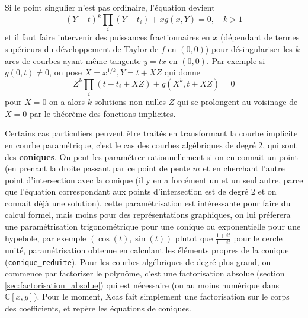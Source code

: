 \documentclass[a4paper,11pt]{article}
\begin{document}
\begin{giacjshere}
Si le point singulier n'est pas ordinaire, l'\'equation devient
$$ (Y-t)^k \prod_i (Y-t_i) + xg(x,Y)=0, \quad k>1$$
et il faut faire intervenir des puissances fractionnaires en $x$
(d\'ependant de termes sup\'erieurs du d\'eveloppement de Taylor
de $f$ en $(0,0)$)
pour d\'esingulariser les $k$ arcs de courbes ayant m\^eme tangente
$y=tx$ en $(0,0)$. Par exemple si $g(0,t) \neq 0$, 
on pose $X=x^{1/k}, Y=t+XZ$
qui donne 
$$ Z^k \prod_i (t-t_i+XZ) + g(X^k,t+XZ)=0$$
pour $X=0$ on a alors $k$ solutions non nulles $Z$ qui
se prolongent au voisinage de $X=0$ par le th\'eor\`eme des
fonctions implicites.

Certains cas particuliers peuvent \^etre trait\'es en
transformant la courbe implicite en courbe param\'etrique,
c'est le cas des courbes alg\'ebriques de degr\'e 2, qui
sont des {\bf coniques}. On peut les param\'etrer rationnellement
si on en connait un point (en prenant la droite passant par ce point
de pente $m$ et en cherchant l'autre point d'intersection
avec la conique (il y en a forc\'ement un et un seul autre,
parce que l'\'equation correspondant aux points
d'intersection est de degr\'e 2
et on connait d\'ej\`a une solution), cette param\'etrisation
est int\'eressante pour faire du calcul formel, mais moins
pour des repr\'esentations graphiques, on lui pr\'eferera
une param\'etrisation trigonom\'etrique pour une conique
ou exponentielle pour une hypebole, par exemple
$(\cos(t),\sin(t))$ plutot que $\frac{1+it}{1-it}$ pour
le cercle unit\'e, param\'etrisation obtenue en calculant
les \'el\'ements propres de la conique (\verb|conique_reduite|). 
Pour les courbes alg\'ebriques de degr\'e
plus grand, on commence par factoriser le polyn\^ome,
c'est une factorisation absolue (section \ref{sec:factorisation_absolue}) qui est n\'ecessaire (ou
au moins num\'erique dans $\mathbb{C}[x,y]$). Pour le moment,
Xcas fait simplement une factorisation sur le corps
des coefficients, et rep\`ere les \'equations de coniques.



\end{giacjshere}
\end{document}
